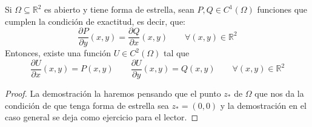 \begin{teo}
    Si $\Omega\subseteq \mathbb{R}^2$ es abierto y tiene forma de estrella, sean $P,Q\in C^1(\Omega)$ funciones que cumplen la condición de exactitud, es decir, que:
    \begin{equation*}
        \dfrac{\partial P}{\partial y}(x,y) = \dfrac{\partial Q}{\partial x}(x,y) \qquad \forall (x,y)\in \mathbb{R}^2
    \end{equation*}
    Entonces, existe una función $U\in C^2(\Omega)$ tal que 
    \begin{equation*}
        \dfrac{\partial U}{\partial x}(x,y) = P(x,y) \qquad \dfrac{\partial U}{\partial y}(x,y) = Q(x,y) \qquad \forall (x,y)\in \mathbb{R}^2
    \end{equation*}
    \begin{proof}
        La demostración la haremos pensando que el punto $z_\ast$ de $\Omega$ que nos da la condición de que tenga forma de estrella sea $z_\ast = (0,0)$ y la demostración en el caso general se deja como ejercicio para el lector.


\end{proof}
\end{teo}
